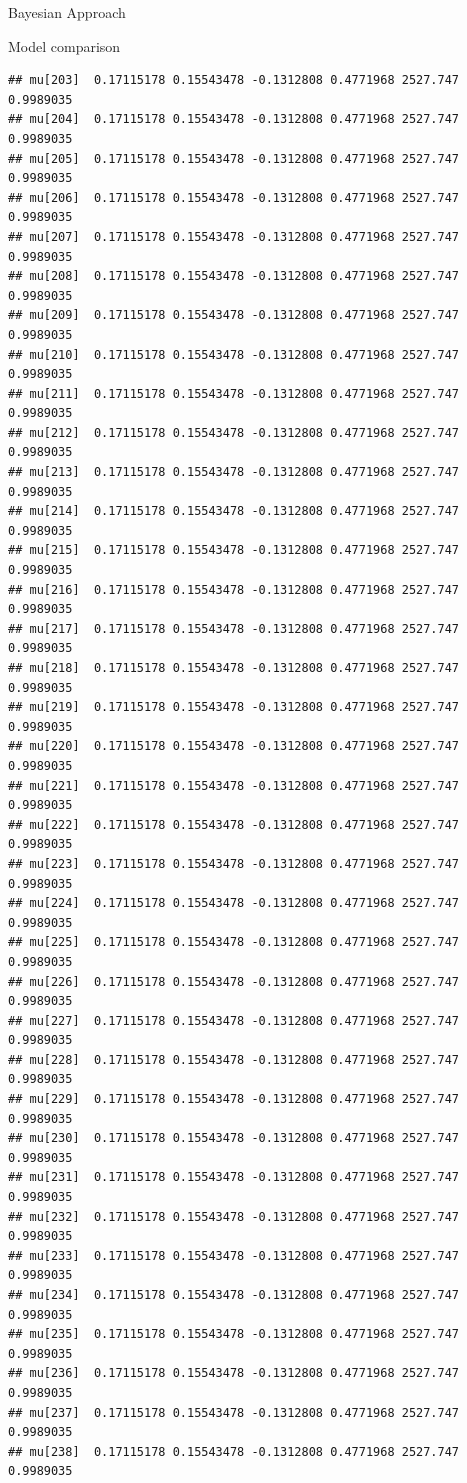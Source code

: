 \documentclass[
  ignorenonframetext,
]{beamer}
\begin{document}
\begin{frame}[fragile]{Bayesian Approach}
\begin{block}{Model comparison}
\begin{verbatim}
## mu[203]  0.17115178 0.15543478 -0.1312808 0.4771968 2527.747 0.9989035
## mu[204]  0.17115178 0.15543478 -0.1312808 0.4771968 2527.747 0.9989035
## mu[205]  0.17115178 0.15543478 -0.1312808 0.4771968 2527.747 0.9989035
## mu[206]  0.17115178 0.15543478 -0.1312808 0.4771968 2527.747 0.9989035
## mu[207]  0.17115178 0.15543478 -0.1312808 0.4771968 2527.747 0.9989035
## mu[208]  0.17115178 0.15543478 -0.1312808 0.4771968 2527.747 0.9989035
## mu[209]  0.17115178 0.15543478 -0.1312808 0.4771968 2527.747 0.9989035
## mu[210]  0.17115178 0.15543478 -0.1312808 0.4771968 2527.747 0.9989035
## mu[211]  0.17115178 0.15543478 -0.1312808 0.4771968 2527.747 0.9989035
## mu[212]  0.17115178 0.15543478 -0.1312808 0.4771968 2527.747 0.9989035
## mu[213]  0.17115178 0.15543478 -0.1312808 0.4771968 2527.747 0.9989035
## mu[214]  0.17115178 0.15543478 -0.1312808 0.4771968 2527.747 0.9989035
## mu[215]  0.17115178 0.15543478 -0.1312808 0.4771968 2527.747 0.9989035
## mu[216]  0.17115178 0.15543478 -0.1312808 0.4771968 2527.747 0.9989035
## mu[217]  0.17115178 0.15543478 -0.1312808 0.4771968 2527.747 0.9989035
## mu[218]  0.17115178 0.15543478 -0.1312808 0.4771968 2527.747 0.9989035
## mu[219]  0.17115178 0.15543478 -0.1312808 0.4771968 2527.747 0.9989035
## mu[220]  0.17115178 0.15543478 -0.1312808 0.4771968 2527.747 0.9989035
## mu[221]  0.17115178 0.15543478 -0.1312808 0.4771968 2527.747 0.9989035
## mu[222]  0.17115178 0.15543478 -0.1312808 0.4771968 2527.747 0.9989035
## mu[223]  0.17115178 0.15543478 -0.1312808 0.4771968 2527.747 0.9989035
## mu[224]  0.17115178 0.15543478 -0.1312808 0.4771968 2527.747 0.9989035
## mu[225]  0.17115178 0.15543478 -0.1312808 0.4771968 2527.747 0.9989035
## mu[226]  0.17115178 0.15543478 -0.1312808 0.4771968 2527.747 0.9989035
## mu[227]  0.17115178 0.15543478 -0.1312808 0.4771968 2527.747 0.9989035
## mu[228]  0.17115178 0.15543478 -0.1312808 0.4771968 2527.747 0.9989035
## mu[229]  0.17115178 0.15543478 -0.1312808 0.4771968 2527.747 0.9989035
## mu[230]  0.17115178 0.15543478 -0.1312808 0.4771968 2527.747 0.9989035
## mu[231]  0.17115178 0.15543478 -0.1312808 0.4771968 2527.747 0.9989035
## mu[232]  0.17115178 0.15543478 -0.1312808 0.4771968 2527.747 0.9989035
## mu[233]  0.17115178 0.15543478 -0.1312808 0.4771968 2527.747 0.9989035
## mu[234]  0.17115178 0.15543478 -0.1312808 0.4771968 2527.747 0.9989035
## mu[235]  0.17115178 0.15543478 -0.1312808 0.4771968 2527.747 0.9989035
## mu[236]  0.17115178 0.15543478 -0.1312808 0.4771968 2527.747 0.9989035
## mu[237]  0.17115178 0.15543478 -0.1312808 0.4771968 2527.747 0.9989035
## mu[238]  0.17115178 0.15543478 -0.1312808 0.4771968 2527.747 0.9989035

\end{verbatim}
\end{block}
\end{frame}
\end{document}
